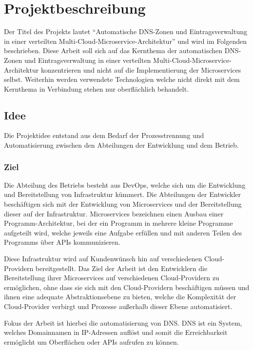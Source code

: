 \chapter{Projektbeschreibung}
\label{ch:description}
Der Titel des Projekts lautet \enquote{Automatische DNS-Zonen und Eintragsverwaltung in einer verteilten Multi-Cloud-Microservice-Architektur} und wird im Folgenden beschrieben.
Diese Arbeit soll sich auf das Kernthema der automatischen DNS-Zonen und Eintragsverwaltung in einer verteilten Multi-Cloud-Microservice-Architektur konzentrieren und nicht auf die Implementierung der Microservices selbst.
Weiterhin werden verwendete Technologien welche nicht direkt mit dem Kernthema in Verbindung stehen nur oberflächlich behandelt.

\section{Idee}
\label{sec:description:projektidee}
Die Projektidee entstand aus dem Bedarf der Prozesstrennung und Automatisierung zwischen den Abteilungen der Entwicklung und dem Betrieb.

\subsection{Ziel}
\label{subsec:description:ziel}
Die Abteilung des Betriebs besteht aus \ac{DevOps}, welche sich um die Entwicklung und Bereitstellung von Infrastruktur kümmert.
Die Abteilungen der Entwickler beschäftigen sich mit der Entwicklung von Microservices und der Bereitstellung dieser auf der Infrastruktur.
Microservices bezeichnen einen Ausbau einer Programm-Architektur, bei der ein Programm in mehrere kleine Programme aufgeteilt wird, welche jeweils eine Aufgabe erfüllen und mit anderen Teilen des Programms über \ac{API}s kommunizieren.
\medskip

Diese Infrastruktur wird auf Kundenwünsch hin auf verschiedenen Cloud-Providern bereitgestellt.
Das Ziel der Arbeit ist den Entwicklern die Bereitstellung ihrer Microservices auf verschiedenen Cloud-Providern zu ermöglichen, ohne dass sie sich mit den Cloud-Providern beschäftigen müssen
und ihnen eine adequate Abstraktionsebene zu bieten, welche die Komplexität der Cloud-Provider verbirgt und Prozesse außerhalb dieser Ebene automatisiert.
\medskip

Fokus der Arbeit ist hierbei die automatisierung von \ac{DNS}.
DNS ist ein System, welches Domainnamen in IP-Adressen auflöst und somit die Erreichbarkeit ermöglicht um Oberflächen oder APIs aufrufen zu können.

